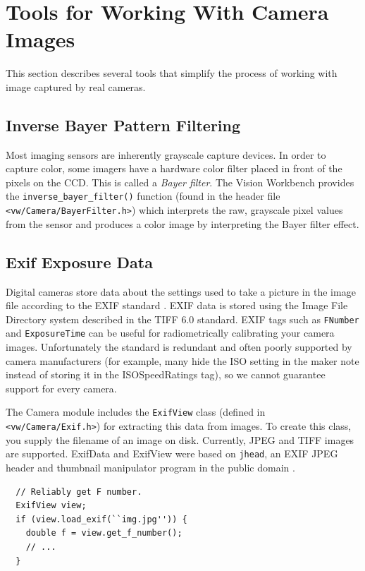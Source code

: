 \section{Tools for Working With Camera Images}

This section describes several tools that simplify the process of
working with image captured by real cameras.

\subsection{Inverse Bayer Pattern Filtering}

Most imaging sensors are inherently grayscale capture devices.  In
order to capture color, some imagers have a hardware color filter
placed in front of the pixels on the CCD.  This is called a 
{\em Bayer filter}.  The Vision Workbench provides the
\verb#inverse_bayer_filter()# function (found in the header file
\verb#<vw/Camera/BayerFilter.h>#) which interprets the raw, grayscale
pixel values from the sensor and produces a color image by
interpreting the Bayer filter effect.

\subsection{Exif Exposure Data}

Digital cameras store data about the settings used to take a picture
in the image file according to the EXIF standard \cite{exif}. EXIF
data is stored using the Image File Directory system described in the
TIFF 6.0 standard.  EXIF tags such as {\tt FNumber} and
{\tt ExposureTime} can be useful for radiometrically calibrating your
camera images.  Unfortunately the standard is redundant and often
poorly supported by camera manufacturers (for example, many hide the
ISO setting in the maker note instead of storing it in the
ISOSpeedRatings tag), so we cannot guarantee support for every camera.

The Camera module includes the {\tt ExifView} class (defined in
\verb#<vw/Camera/Exif.h>#) for extracting this data from images.  To
create this class, you supply the filename of an image on disk.
Currently, JPEG and TIFF images are supported.  ExifData and ExifView
were based on {\tt jhead}, an EXIF JPEG header and thumbnail manipulator
program in the public domain \cite{jhead}.

\begin{verbatim}
  // Reliably get F number. 
  ExifView view;
  if (view.load_exif(``img.jpg'')) {
    double f = view.get_f_number();
    // ...
  }
\end{verbatim}

